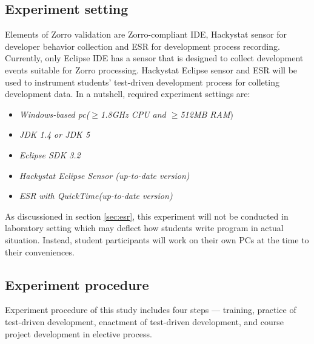 \subsection{Experiment setting}
Elements of Zorro validation are Zorro-compliant IDE, Hackystat sensor for
developer behavior collection and ESR for development process recording.
Currently, only Eclipse IDE has a sensor that is designed to collect
development events suitable for Zorro processing. Hackystat Eclipse sensor
and ESR will be used to instrument students' test-driven development
process for colleting development data. In a nutshell, required experiment
settings are:
\begin{itemize}
\item \textit{Windows-based pc(\begin{math}\ge\end{math}1.8GHz CPU and
    \begin{math}\ge\end{math}512MB RAM})
\item \textit{JDK 1.4 or JDK 5}
\item \textit{Eclipse SDK 3.2}
\item \textit{Hackystat Eclipse Sensor (up-to-date version)}
\item \textit{ESR with QuickTime(up-to-date version)}
\end{itemize}

As discussioned in section \ref{sec:esr}, this experiment will not be
conducted in laboratory setting which may deflect how students write
program in actual situation. Instead, student participants will work on
their own PCs at the time to their conveniences.

\subsection{Experiment procedure}
Experiment procedure of this study includes four steps --- training,
practice of test-driven development, enactment of test-driven development,
and course project development in elective process.

